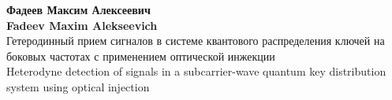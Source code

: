 \thispagestyle{empty}


\vspace{0pt plus2fill} %

\vspace*{250pt}
\begin{center}
{\large  
\textbf{Фадеев Максим Алексеевич}}\\
{\large 
\textbf{Fadeev Maxim Alekseevich}}\\
\textbf {\large %
} Гетеродинный прием сигналов в системе квантового распределения ключей на боковых частотах с применением оптической инжекции\\
\textbf {\large %
} Heterodyne detection of signals in a subcarrier-wave quantum key distribution system using optical injection
\end{center}

\vspace{0pt plus2fill} %




